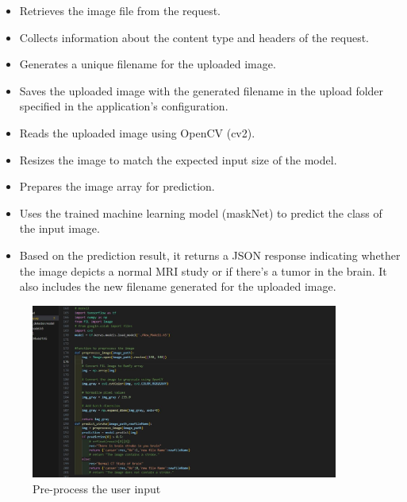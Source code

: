 \begin{itemize}
    \item Retrieves the image file from the request.
    \item Collects information about the content type and headers of the request.
    \item Generates a unique filename for the uploaded image.
    \item Saves the uploaded image with the generated filename in the upload folder specified in the application's configuration.
    \item Reads the uploaded image using OpenCV (cv2).
    \item Resizes the image to match the expected input size of the model.
    \item Prepares the image array for prediction.
    \item Uses the trained machine learning model (maskNet) to predict the class of the input image.
    \item Based on the prediction result, it returns a JSON response indicating whether the image depicts a normal MRI study or if there's a tumor in the brain. It also includes the new filename generated for the uploaded image.
\end{itemize}

\begin{figure}
    \centering
    \includegraphics[width=0.90\textwidth]{Img/Chap-01/47.jpg}
    \caption{Pre-process the user input}
    \label{fig:be_6}
\end{figure}

